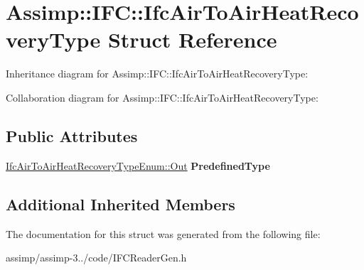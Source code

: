 \hypertarget{struct_assimp_1_1_i_f_c_1_1_ifc_air_to_air_heat_recovery_type}{\section{Assimp\+:\+:I\+F\+C\+:\+:Ifc\+Air\+To\+Air\+Heat\+Recovery\+Type Struct Reference}
\label{struct_assimp_1_1_i_f_c_1_1_ifc_air_to_air_heat_recovery_type}
}


Inheritance diagram for Assimp\+:\+:I\+F\+C\+:\+:Ifc\+Air\+To\+Air\+Heat\+Recovery\+Type\+:


Collaboration diagram for Assimp\+:\+:I\+F\+C\+:\+:Ifc\+Air\+To\+Air\+Heat\+Recovery\+Type\+:
\subsection*{Public Attributes}
\begin{DoxyCompactItemize}
\item 
\hypertarget{struct_assimp_1_1_i_f_c_1_1_ifc_air_to_air_heat_recovery_type_ac9dba676def41c2ef4dfad56627e235d}{\hyperlink{classboost_1_1shared__ptr}{Ifc\+Air\+To\+Air\+Heat\+Recovery\+Type\+Enum\+::\+Out} {\bfseries Predefined\+Type}}\label{struct_assimp_1_1_i_f_c_1_1_ifc_air_to_air_heat_recovery_type_ac9dba676def41c2ef4dfad56627e235d}

\end{DoxyCompactItemize}
\subsection*{Additional Inherited Members}


The documentation for this struct was generated from the following file\+:\begin{DoxyCompactItemize}
\item 
assimp/assimp-\/3../code/I\+F\+C\+Reader\+Gen.\+h\end{DoxyCompactItemize}
